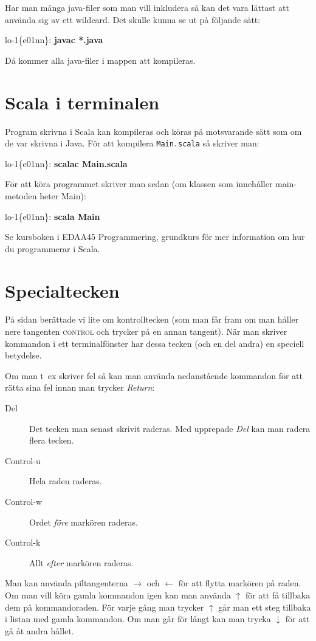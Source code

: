 \documentclass[a4paper,twocolumn]{book}
\begin{document}
Har man många java-filer som man vill inkludera så kan det vara lättast att
använda sig av ett wildcard. Det skulle kunna se ut på följande sätt:
\begin{example}
lo-1\{e01nn\}: \textbf{javac *.java}
\end{example}
Då kommer alla java-filer i mappen att kompileras.

\section{Scala i terminalen}
Program skrivna i Scala kan kompileras och köras på motsvarande sätt som om de var skrivna i Java. För att kompilera \texttt{Main.scala} så skriver man:
\begin{example}
lo-1\{e01nn\}: \textbf{scalac Main.scala}
\end{example}
För att köra programmet skriver man sedan (om klassen som innehåller main-metoden heter Main):
\begin{example}
lo-1\{e01nn\}: \textbf{scala Main}
\end{example}

Se kursboken i EDAA45 Programmering, grundkurs för mer information om hur du programmerar i Scala.


\section{Specialtecken}

På sidan \pageref{control} berättade vi lite om
kontrolltecken (som man får fram om man håller nere tangenten
\textsc{control} och trycker på en annan tangent). När man skriver
kommandon i ett terminalfönster har dessa tecken (och en del andra) en
speciell betydelse.

Om man t~ex skriver fel så kan man använda nedanstående kommandon för
att rätta sina fel innan man trycker \emph{Return}:
\begin{description}
\item[Del] Det tecken man senast skrivit raderas. Med upprepade
  \emph{Del} kan man radera flera tecken.
\item[Control-u] Hela raden raderas.
\item[Control-w] Ordet \emph{före} markören raderas.
\item[Control-k] Allt \emph{efter} markören raderas.
\end{description}
Man kan använda piltangenterna $\rightarrow$ och $\leftarrow$ för att
flytta markören på raden. Om man vill köra gamla kommandon igen kan
man använda $\uparrow$ för att få tillbaka dem på kommandoraden. För
varje gång man trycker $\uparrow$ går man ett steg tillbaka i listan
med gamla kommandon. Om man går för långt kan man trycka $\downarrow$
för att gå åt andra hållet.
\end{document}
